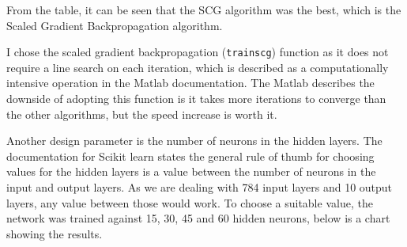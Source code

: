 From the table, it can be seen that the SCG algorithm was the best, which is the Scaled Gradient Backpropagation algorithm.

I chose the scaled gradient backpropagation (\verb|trainscg|) function as it does not require a line search on each iteration,
which is described as a computationally intensive operation in the Matlab documentation.
The Matlab describes the downside of adopting this function is it takes more iterations to converge than the other algorithms,
but the speed increase is worth it.


Another design parameter is the number of neurons in the hidden layers.
The documentation for Scikit learn states the general rule of thumb for choosing values for the hidden layers is a value between the number of neurons in the input and output layers.
As we are dealing with 784 input layers and 10 output layers, any value between those would work.
To choose a suitable value, the network was trained against 15, 30, 45 and 60 hidden neurons, below is a chart showing the results.

